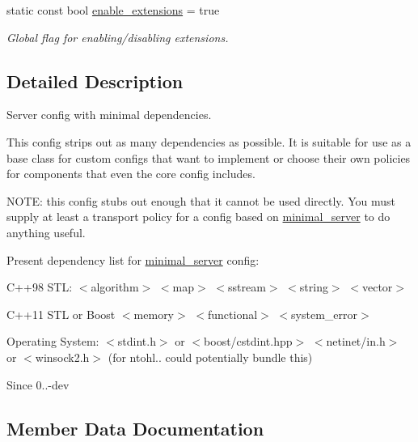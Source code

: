 \begin{DoxyCompactItemize}
\mbox{\label{structwebsocketpp_1_1config_1_1minimal__server_ae25bd7e239136a81b9756d6be0818466}} 
static const bool \mbox{\hyperlink{structwebsocketpp_1_1config_1_1minimal__server_ae25bd7e239136a81b9756d6be0818466}{enable\+\_\+extensions}} = true
\begin{DoxyCompactList}\small\item\em Global flag for enabling/disabling extensions. \end{DoxyCompactList}\end{DoxyCompactItemize}


\subsection{Detailed Description}
Server config with minimal dependencies. 

This config strips out as many dependencies as possible. It is suitable for use as a base class for custom configs that want to implement or choose their own policies for components that even the core config includes.

N\+O\+TE\+: this config stubs out enough that it cannot be used directly. You must supply at least a transport policy for a config based on {\ttfamily \mbox{\hyperlink{structwebsocketpp_1_1config_1_1minimal__server}{minimal\+\_\+server}}} to do anything useful.

Present dependency list for \mbox{\hyperlink{structwebsocketpp_1_1config_1_1minimal__server}{minimal\+\_\+server}} config\+:

C++98 S\+TL\+: $<$algorithm$>$ $<$map$>$ $<$sstream$>$ $<$string$>$ $<$vector$>$

C++11 S\+TL or Boost $<$memory$>$ $<$functional$>$ $<$system\+\_\+error$>$

Operating System\+: $<$stdint.\+h$>$ or $<$boost/cstdint.\+hpp$>$ $<$netinet/in.\+h$>$ or $<$winsock2.\+h$>$ (for ntohl.. could potentially bundle this)

\begin{DoxySince}{Since}
0..-\/dev 
\end{DoxySince}


\subsection{Member Data Documentation}
\mbox{\label{structwebsocketpp_1_1config_1_1minimal__server_ae71d1728a8d49acd97ec29a6fdfd440c}} 
